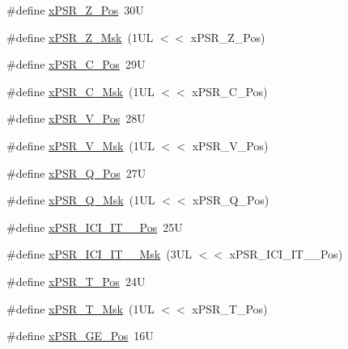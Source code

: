 \begin{DoxyCompactItemize}
\#define \mbox{\hyperlink{group___c_m_s_i_s___c_o_r_e_ga5869dd608eea73c80f0567d781d2230b}{x\+P\+S\+R\+\_\+\+Z\+\_\+\+Pos}}~30U
\item 
\#define \mbox{\hyperlink{group___c_m_s_i_s___c_o_r_e_ga907599209fba99f579778e662021c4f2}{x\+P\+S\+R\+\_\+\+Z\+\_\+\+Msk}}~(1\+U\+L $<$$<$ x\+P\+S\+R\+\_\+\+Z\+\_\+\+Pos)
\item 
\#define \mbox{\hyperlink{group___c_m_s_i_s___c_o_r_e_ga14adb79b91f6634b351a1b57394e2db6}{x\+P\+S\+R\+\_\+\+C\+\_\+\+Pos}}~29U
\item 
\#define \mbox{\hyperlink{group___c_m_s_i_s___c_o_r_e_ga21e2497255d380f956ca0f48d11d0775}{x\+P\+S\+R\+\_\+\+C\+\_\+\+Msk}}~(1\+U\+L $<$$<$ x\+P\+S\+R\+\_\+\+C\+\_\+\+Pos)
\item 
\#define \mbox{\hyperlink{group___c_m_s_i_s___c_o_r_e_gae0cfbb394490db402623d97e6a979e00}{x\+P\+S\+R\+\_\+\+V\+\_\+\+Pos}}~28U
\item 
\#define \mbox{\hyperlink{group___c_m_s_i_s___c_o_r_e_gab07f94ed3b6ee695f5af719dc27995c2}{x\+P\+S\+R\+\_\+\+V\+\_\+\+Msk}}~(1\+U\+L $<$$<$ x\+P\+S\+R\+\_\+\+V\+\_\+\+Pos)
\item 
\#define \mbox{\hyperlink{group___c_m_s_i_s___c_o_r_e_gaabb4178d50676a8f19cf8f727f38ace8}{x\+P\+S\+R\+\_\+\+Q\+\_\+\+Pos}}~27U
\item 
\#define \mbox{\hyperlink{group___c_m_s_i_s___c_o_r_e_ga133ac393c38559ae43ac36383e731dd4}{x\+P\+S\+R\+\_\+\+Q\+\_\+\+Msk}}~(1\+U\+L $<$$<$ x\+P\+S\+R\+\_\+\+Q\+\_\+\+Pos)
\item 
\#define \mbox{\hyperlink{group___c_m_s_i_s___c_o_r_e_gaffb36d1bb0280b1caafcf9b00f6a6da0}{x\+P\+S\+R\+\_\+\+I\+C\+I\+\_\+\+I\+T\+\_\+\_\+\+Pos}}~25U
\item 
\#define \mbox{\hyperlink{group___c_m_s_i_s___c_o_r_e_gaa47c89b028499f8d9ebe6d554439a2b3}{x\+P\+S\+R\+\_\+\+I\+C\+I\+\_\+\+I\+T\+\_\+\_\+\+Msk}}~(3\+U\+L $<$$<$ x\+P\+S\+R\+\_\+\+I\+C\+I\+\_\+\+I\+T\+\_\+\_\+\+Pos)
\item 
\#define \mbox{\hyperlink{group___c_m_s_i_s___c_o_r_e_ga98d801da9a49cda944f52aeae104dd38}{x\+P\+S\+R\+\_\+\+T\+\_\+\+Pos}}~24U
\item 
\#define \mbox{\hyperlink{group___c_m_s_i_s___c_o_r_e_ga30ae2111816e82d47636a8d4577eb6ee}{x\+P\+S\+R\+\_\+\+T\+\_\+\+Msk}}~(1\+U\+L $<$$<$ x\+P\+S\+R\+\_\+\+T\+\_\+\+Pos)
\item 
\#define \mbox{\hyperlink{group___c_m_s_i_s___c_o_r_e_gae2b0f3def0f378e9f1d10a4c727a064b}{x\+P\+S\+R\+\_\+\+G\+E\+\_\+\+Pos}}~16U
\item 

\end{DoxyCompactItemize}
